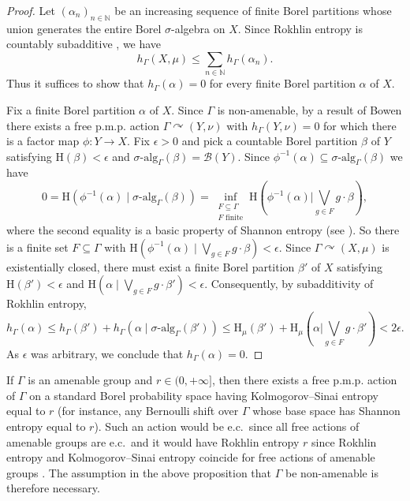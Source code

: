 \documentclass[12pt]{amsart}
\theoremstyle{definition}
\newcommand\bN{{\mathbb N}}
\newcommand{\pmp}{p{$.$}m{$.$}p{$.$}}
\newcommand{\acts}{\curvearrowright}
\newcommand{\salg}{\sigma \text{-}\mathrm{alg}}
\newcommand{\sH}{\mathrm{H}}
\newcommand{\rh}{h}
\newcommand{\Borel}{\mathcal{B}}
\newcommand{\given}{\mathbin{|}}
\newcommand{\Given}{\mathbin{\Big|}}
\begin{document}
\begin{proof}
Let $(\alpha_n)_{n \in \bN}$ be an increasing sequence of finite Borel partitions whose union generates the entire Borel $\sigma$-algebra on $X$. Since Rokhlin entropy is countably subadditive \cite[Corollary 1.5]{AlpSew}, we have
$$\rh_\Gamma(X, \mu) \leq \sum_{n \in \bN} \rh_\Gamma(\alpha_n).$$
Thus it suffices to show that $\rh_\Gamma(\alpha) = 0$ for every finite Borel partition $\alpha$ of $X$.

Fix a finite Borel partition $\alpha$ of $X$. Since $\Gamma$ is non-amenable, by a result of Bowen \cite{bowen} there exists a free {\pmp} action $\Gamma \acts (Y, \nu)$ with $\rh_\Gamma(Y, \nu) = 0$ for which there is a factor map $\phi : Y \rightarrow X$. Fix $\epsilon > 0$ and pick a countable Borel partition $\beta$ of $Y$ satisfying $\sH(\beta) < \epsilon$ and $\salg_\Gamma(\beta) = \Borel(Y)$. Since $\phi^{-1}(\alpha) \subseteq \salg_\Gamma(\beta)$ we have
$$0 = \sH(\phi^{-1}(\alpha) \given \salg_\Gamma(\beta)) = \inf_{\substack{F \subseteq \Gamma\\F \text{ finite}}} \sH\left(\phi^{-1}(\alpha) \Given \bigvee_{g \in F} g \cdot \beta\right),$$
where the second equality is a basic property of Shannon entropy (see \cite[Lemma 1.7.11]{Dow11}). So there is a finite set $F \subseteq \Gamma$ with $\sH(\phi^{-1}(\alpha) \given \bigvee_{g \in F} g \cdot \beta) < \epsilon$. Since $\Gamma \acts (X, \mu)$ is existentially closed, there must exist a finite Borel partition $\beta'$ of $X$ satisfying $\sH(\beta') < \epsilon$ and $\sH(\alpha \given \bigvee_{g \in F} g \cdot \beta') < \epsilon$. Consequently, by subadditivity of Rokhlin entropy,
$$\rh_\Gamma(\alpha) \leq \rh_\Gamma(\beta') + \rh_\Gamma(\alpha \given \salg_\Gamma(\beta')) \leq \sH_\mu(\beta') + \sH_\mu \left( \alpha \Given \bigvee_{g \in F} g \cdot \beta' \right) < 2 \epsilon.$$
As $\epsilon$ was arbitrary, we conclude that $\rh_\Gamma(\alpha) = 0$.
\end{proof}

If $\Gamma$ is an amenable group and $r \in (0, +\infty]$, then there exists a free {\pmp} action of $\Gamma$ on a standard Borel probability space having Kolmogorov--Sinai entropy equal to $r$ (for instance, any Bernoulli shift over $\Gamma$ whose base space has Shannon entropy equal to $r$). Such an action would be e.c.\ since all free actions of amenable groups are e.c.\, and it would have Rokhlin entropy $r$ since Rokhlin entropy and Kolmogorov--Sinai entropy coincide for free actions of amenable groups \cite[Corollary 1.9]{AlpSew}. The assumption in the above proposition that $\Gamma$ be non-amenable is therefore necessary.
\end{document}
